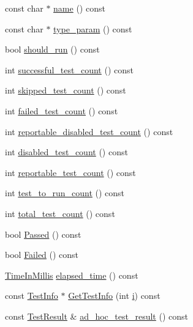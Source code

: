 \begin{DoxyCompactItemize}
const char $\ast$ \mbox{\hyperlink{classtesting_1_1_test_suite_ab3369db678ca3d9648d6fd63ad038986}{name}} () const
\item 
const char $\ast$ \mbox{\hyperlink{classtesting_1_1_test_suite_ab2ea12318bdbfb6aa97792344b49e3db}{type\+\_\+param}} () const
\item 
bool \mbox{\hyperlink{classtesting_1_1_test_suite_a8f62c17baef80042e0ff03ef5d5e4ba7}{should\+\_\+run}} () const
\item 
int \mbox{\hyperlink{classtesting_1_1_test_suite_a85bc4191681df7e8bae810c1744465ec}{successful\+\_\+test\+\_\+count}} () const
\item 
int \mbox{\hyperlink{classtesting_1_1_test_suite_ae48c72ff92fa1c555e3b577f8661285c}{skipped\+\_\+test\+\_\+count}} () const
\item 
int \mbox{\hyperlink{classtesting_1_1_test_suite_aaf18223e67cf0761f56bd4b8167abc6c}{failed\+\_\+test\+\_\+count}} () const
\item 
int \mbox{\hyperlink{classtesting_1_1_test_suite_ab0b3d1ee8efaa18ceb2553a71002c678}{reportable\+\_\+disabled\+\_\+test\+\_\+count}} () const
\item 
int \mbox{\hyperlink{classtesting_1_1_test_suite_adba738351633471e3256dcf7d3c2e61e}{disabled\+\_\+test\+\_\+count}} () const
\item 
int \mbox{\hyperlink{classtesting_1_1_test_suite_a24f62e17cfd37b90263f1194fb7d4d74}{reportable\+\_\+test\+\_\+count}} () const
\item 
int \mbox{\hyperlink{classtesting_1_1_test_suite_a1ccf2681712a3a27659789009815db8f}{test\+\_\+to\+\_\+run\+\_\+count}} () const
\item 
int \mbox{\hyperlink{classtesting_1_1_test_suite_a38a5e95341cfee5a88d8910f69da4960}{total\+\_\+test\+\_\+count}} () const
\item 
bool \mbox{\hyperlink{classtesting_1_1_test_suite_add51ece89b069b29e07f0476e0e6aae9}{Passed}} () const
\item 
bool \mbox{\hyperlink{classtesting_1_1_test_suite_adec55446c23dc2d0bfea91c6125a1047}{Failed}} () const
\item 
\mbox{\hyperlink{namespacetesting_a992de1d091ce660f451d1e8b3ce30fd6}{Time\+In\+Millis}} \mbox{\hyperlink{classtesting_1_1_test_suite_a2ede69fa37985ab8b21128955c56d6d7}{elapsed\+\_\+time}} () const
\item 
const \mbox{\hyperlink{classtesting_1_1_test_info}{Test\+Info}} $\ast$ \mbox{\hyperlink{classtesting_1_1_test_suite_aa6e617d79e4272362735ca9be4fb40d7}{Get\+Test\+Info}} (int \mbox{\hyperlink{_obj__test_2lib_2googletest-master_2googlemock_2test_2gmock-matchers__test_8cc_acb559820d9ca11295b4500f179ef6392}{i}}) const
\item 
const \mbox{\hyperlink{classtesting_1_1_test_result}{Test\+Result}} \& \mbox{\hyperlink{classtesting_1_1_test_suite_a3391a0ec111c66e1ac16a800f5068af7}{ad\+\_\+hoc\+\_\+test\+\_\+result}} () const
\end{DoxyCompactItemize}
